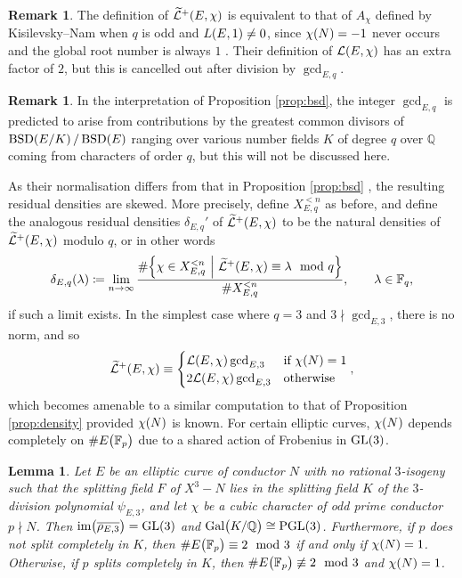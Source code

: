 \documentclass{article}
\theoremstyle{plain}
\newtheorem{lemma}[n]{Lemma}
\theoremstyle{definition}
\newtheorem{remark}[n]{Remark}
\newcommand{\BSD}{\operatorname{BSD}}
\newcommand{\FF}{\mathbb{F}}
\newcommand{\Gal}{\operatorname{Gal}}
\newcommand{\GL}{\operatorname{GL}}
\newcommand{\im}{\operatorname{im}}
\newcommand{\LLL}{\mathcal{L}}
\newcommand{\PGL}{\operatorname{PGL}}
\newcommand{\QQ}{\mathbb{Q}}
\newcommand{\br}{\!\del}
\newcommand{\st}{\ \middle| \ }
\begin{document}
\begin{remark}
The definition of $ \widetilde{\LLL}^+\br{E, \chi} $ is equivalent to that of $ A_\chi $ defined by Kisilevsky--Nam when $ q $ is odd and $ L\br{E, 1} \ne 0 $, since $ \chi\br{N} = -1 $ never occurs and the global root number is always $ 1 $ \cite[Section 2.2]{KN22}. Their definition of $ \LLL\br{E, \chi} $ has an extra factor of $ 2 $, but this is cancelled out after division by $ \gcd_{E, q} $.
\end{remark}

\begin{remark}
In the interpretation of Proposition \ref{prop:bsd}, the integer $ \gcd_{E, q} $ is predicted to arise from contributions by the greatest common divisors of $ \BSD\br[0]{E / K} / \BSD\br{E} $ ranging over various number fields $ K $ of degree $ q $ over $ \QQ $ coming from characters of order $ q $, but this will not be discussed here.
\end{remark}

As their normalisation differs from that in Proposition \ref{prop:bsd} \cite[Remark 1]{KN22}, the resulting residual densities are skewed. More precisely, define $ X_{E, q}^{< n} $ as before, and define the analogous residual densities $ \delta_{E, q}' $ of $ \widetilde{\LLL}^+\br{E, \chi} $ to be the natural densities of $ \widetilde{\LLL}^+\br{E, \chi} $ modulo $ q $, or in other words
$$ \delta_{E, q}\br{\lambda} \coloneqq \lim_{n \to \infty} \dfrac{\#\cbr{\chi \in X_{E, q}^{< n} \st \widetilde{\LLL}^+\br{E, \chi} \equiv \lambda \mod q}}{\#X_{E, q}^{< n}}, \qquad \lambda \in \FF_q, $$
if such a limit exists. In the simplest case where $ q = 3 $ and $ 3 \nmid \gcd_{E, 3} $, there is no norm, and so
$$ \widetilde{\LLL}^+\br{E, \chi} \equiv
\begin{cases}
\LLL\br{E, \chi}\gcd_{E, 3} & \text{if} \ \chi\br{N} = 1 \\
2\LLL\br{E, \chi}\gcd_{E, 3} & \text{otherwise}
\end{cases},
$$
which becomes amenable to a similar computation to that of Proposition \ref{prop:density} provided $ \chi\br{N} $ is known. For certain elliptic curves, $ \chi\br{N} $ depends completely on $ \#E\br{\FF_p} $ due to a shared action of Frobenius in $ \GL\br{3} $.

\begin{lemma}
\label{lem:cubic}
Let $ E $ be an elliptic curve of conductor $ N $ with no rational $ 3 $-isogeny such that the splitting field $ F $ of $ X^3 - N $ lies in the splitting field $ K $ of the $ 3 $-division polynomial $ \psi_{E, 3} $, and let $ \chi $ be a cubic character of odd prime conductor $ p \nmid N $. Then $ \im\br{\overline{\rho_{E, 3}}} = \GL\br{3} $ and $ \Gal\br{K / \QQ} \cong \PGL\br{3} $. Furthermore, if $ p $ does not split completely in $ K $, then $ \#E\br{\FF_p} \equiv 2 \mod 3 $ if and only if $ \chi\br{N} = 1 $. Otherwise, if $ p $ splits completely in $ K $, then $ \#E\br{\FF_p} \not\equiv 2 \mod 3 $ and $ \chi\br{N} = 1 $.
\end{lemma}
\end{document}
